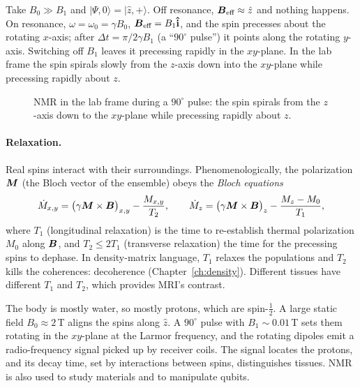 Take $B_0\gg B_1$ and $|\Psi,0\rangle = |\hat{z},+\rangle$. Off resonance, $\vect{B}_{\text{eff}}\approx\hat{z}$ and nothing happens. On resonance, $\omega = \omega_0 = \gamma B_0$, $\vect{B}_{\text{eff}} = B_1\ihat$, and the spin precesses about the rotating $x$-axis; after $\Delta t = \pi/2\gamma B_1$ (a ``$90^\circ$ pulse'') it points along the rotating $y$-axis. Switching off $B_1$ leaves it precessing rapidly in the $xy$-plane. In the lab frame the spin spirals slowly from the $z$-axis down into the $xy$-plane while precessing rapidly about $z$.

\begin{figure}[ht]
\centering
{}
\caption{NMR in the lab frame during a $90^\circ$ pulse: the spin spirals from the $z$-axis down to the $xy$-plane while precessing rapidly about $z$.}
\end{figure}

\paragraph{Relaxation.} Real spins interact with their surroundings. Phenomenologically, the polarization $\bm{M}$ (the Bloch vector of the ensemble) obeys the \emph{Bloch equations}
\[
    \dot{M}_{x,y} = \bigl(\gamma\lvect{M}\times\vect{B}\bigr)_{x,y} - \frac{M_{x,y}}{T_2},
    \qquad
    \dot{M}_z = \bigl(\gamma\lvect{M}\times\vect{B}\bigr)_z - \frac{M_z - M_0}{T_1},
\]
where $T_1$ (longitudinal relaxation) is the time to re-establish thermal polarization $M_0$ along $\vect{B}$, and $T_2\le2T_1$ (transverse relaxation) the time for the precessing spins to dephase. In density-matrix language, $T_1$ relaxes the populations and $T_2$ kills the coherences: decoherence (Chapter~\ref{ch:density}). Different tissues have different $T_1$ and $T_2$, which provides MRI's contrast.

\begin{fact}
The body is mostly water, so mostly protons, which are spin-$\frac12$. A large static field $B_0\approx2$\,T aligns the spins along $\hat{z}$. A $90^\circ$ pulse with $B_1\sim0.01$\,T sets them rotating in the $xy$-plane at the Larmor frequency, and the rotating dipoles emit a radio-frequency signal picked up by receiver coils. The signal locates the protons, and its decay time, set by interactions between spins, distinguishes tissues. NMR is also used to study materials and to manipulate qubits.
\end{fact}

